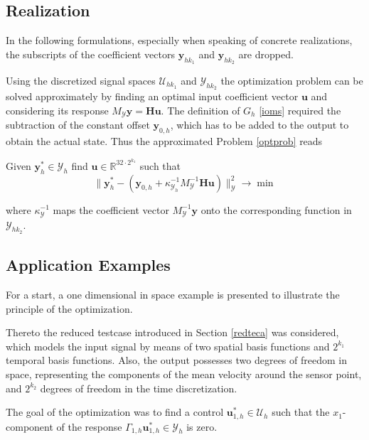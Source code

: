 \documentclass[a4paper,10pt,BCOR=15mm]{scrbook}
\providecommand{\norm}[1]{\lVert#1 \rVert}
\begin{document}
\subsection{Realization}
In the following formulations, especially when speaking of concrete realizations, the subscripts of the coefficient vectors $\mathbf y_{hk_1}$ and $\mathbf y_{hk_2}$ are dropped.

Using the discretized signal spaces $\mathcal U_{hk_1}$ and $\mathcal Y_{hk_2}$ the optimization problem can be solved approximately by finding an optimal input coefficient vector $\mathbf u$ and considering its response $M_{\mathcal Y} \mathbf y = \mathbf H \mathbf u$. The definition of $G_h$ \eqref{ioms} required the subtraction of the constant offset $\mathbf y_{0,h}$, which has to be added to the output to obtain the actual state. Thus the approximated Problem \ref{optprob} reads
\begin{prob}\label{apoppr}
Given $\mathbf y_h^* \in \mathcal Y_h$ find $\mathbf u \in \mathbb R  ^ {32 \cdot 2^{k_1}}$ such that 
 \begin{equation}\label{objfun1}
 \norm{\mathbf y_h^* - (\mathbf y_{0,h} + \kappa_{\mathcal Y_h}^{-1} M_{\mathcal Y}^{-1} \mathbf H \mathbf u )}^2_{\mathcal Y} \rightarrow \min
\end{equation}
\end{prob}
where $ \kappa_{\mathcal Y}^{-1}$ maps the coefficient vector $M_{\mathcal Y}^{-1}{\mathbf y}$ onto the corresponding function in $\mathcal Y_{hk_2}$. 

\subsection{Application Examples}

For a start, a one dimensional in space example is presented to illustrate the principle of the optimization.

Thereto the reduced testcase introduced in Section \ref{redteca} was considered, which models the input signal by means of two spatial basis functions and $2^{k_1}$ temporal basis functions. Also, the output possesses two degrees of freedom in space, representing the components of the mean velocity around the sensor point, and $2^{k_2}$ degrees of freedom in the time discretization. 

The goal of the optimization was to find a control $\mathbf u^*_{1,h} \in \mathcal U_h$ such that the $x_1$-component of the response $\Gamma _{1,h}\mathbf u^*_{1,h} \in \mathcal Y_h$ is zero. 
\end{document}
